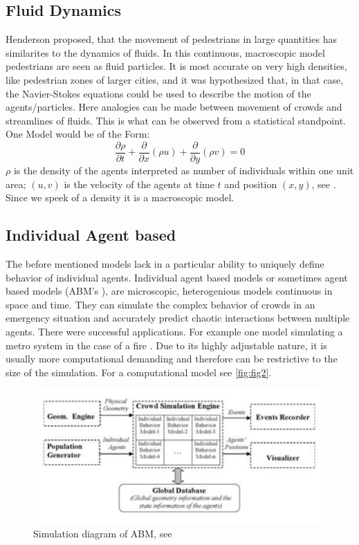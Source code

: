 \subsection{Fluid Dynamics}
Henderson \cite{henderson1971statistics} proposed, that the movement of pedestrians in large quantities has similarites to the dynamics of fluids. 
In this continuous, macroscopic model pedestrians are seen as fluid particles.  
It is most accurate on very high densities, like pedestrian zones of larger cities, and it was hypothesized \cite{bradley1993proposed} that, 
in that case, the Navier-Stokes equations could be used to describe the motion of the agents/particles. 
Here analogies can be made between movement of crowds and streamlines of fluids.
This is what can be observed from a statistical standpoint. 
One Model would be of the Form: 
\begin{equation}
   \frac{\partial \rho}{\partial t} + \frac{\partial}{\partial x}(\rho u) + \frac{\partial}{\partial y}(\rho v) = 0
\end{equation}
$\rho$ is the density of the agents interpreted as number of individuals within one unit area;
$(u,v)$ is the velocity of the agents at time $t$ and position $(x,y)$, see \cite{hughes2002continuum}.
Since we speek of a density it is a macroscopic model.

\subsection{Individual Agent based}
The before mentioned models lack in a particular ability to uniquely define behavior of individual agents. 
Individual agent based models or sometimes agent based models (ABM's \cite{goldstone2005computational}), are
microscopic, heterogenious models continuous in space and time. 
They can simulate the complex behavior of crowds in an emergency situation and accurately predict chaotic interactions between multiple agents. 
There were successful applications. For example one model simulating a metro system in the case of a fire \cite{zarboutis2004searching}.
Due to its highly adjustable nature, 
it is usually more computational demanding and therefore can be restrictive to the size of the simulation. 
For a computational model see \autoref*{fig:fig2}.

\begin{figure}[h]
   \centering 
   \includegraphics[width=0.8\linewidth]{content/figures/ABMdiagram.png} 
   \caption{Simulation diagram of ABM, see \cite{pan2007multi}}
   \label{fig:fig2}
\end{figure}


